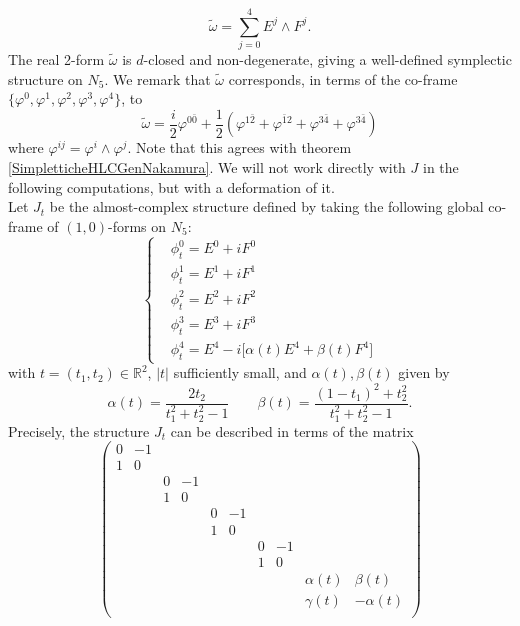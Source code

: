 \documentclass[a4paper, 11pt]{amsart}
\theoremstyle{plain}
\theoremstyle{definition}
\numberwithin{equation}{section}
\begin{document}
\[ \tilde{\omega} = \sum_{j = 0}^{4} E^{j} \wedge F^{j}. \]
The real 2-form $ \tilde{\omega} $ is $ d $-closed and non-degenerate, giving a well-defined symplectic structure on $ N_{5} $. We remark that $  \tilde{\omega}  $ corresponds, in terms of the co-frame $ \{\varphi^{0}, \varphi^{1}, \varphi^{2}, \varphi^{3}, \varphi^{4}\} $, to
\[ \tilde{\omega} = \dfrac{i}{2}\varphi^{0\bar 0} + \dfrac{1}{2}(\varphi^{1\bar 2} + \varphi^{\bar 1 2} + \varphi^{3 \bar 4} + \varphi^{3 \bar 4}) \]
where $ \varphi^{ij} = \varphi^{i} \wedge \varphi^{j} $. Note that this agrees with theorem \ref{SimpletticheHLCGenNakamura}. We will not work directly with $ J $ in the following computations, but with a deformation of it.\\
Let $ J_{t} $ be the almost-complex structure defined by taking the following global co-frame of $ (1,0) $-forms on $ N_{5} $:
\begin{equation*}
\left\{
	\begin{split}
		& \phi_{t}^{0} = E^{0} + iF^{0} \\
		& \phi_{t}^{1} = E^{1} + iF^{1} \\
		& \phi_{t}^{2} = E^{2} + iF^{2} \\
		& \phi_{t}^{3} = E^{3} + iF^{3} \\
		& \phi_{t}^{4} = E^{4} -i\Big[\alpha(t)E^{4} +\beta(t)F^{4}\Big]
	\end{split}
    \right.
\end{equation*}
with $ t = (t_{1}, t_{2}) \in \mathbb{R}^{2} $, $ |t| $ sufficiently small, and $ \alpha(t), \beta(t) $ given by
\[ \alpha(t) = \dfrac{2t_{2}}{t_{1}^{2}+t_{2}^{2} -1} \qquad \beta(t) = \dfrac{(1-t_{1})^{2} + t_{2}^{2}}{t_{1}^{2}+t_{2}^{2} -1}.\]
Precisely, the structure $ J_{t} $ can be described in terms of the matrix
\[ \begin{pmatrix}
	0 & -1 & & & & & & & & \\
	1 & 0 & & & & & & & & \\
	& & 0 & -1 & & & & & & \\
	& & 1 & 0 & & & & & & \\
	& & & &0 & -1 & & & &  \\
	& & & &1 & 0 & & & & \\
	& & & & & & 0 & -1 & & \\
	& & & & & & 1 & 0 & &  \\
	& & & & & & & &  \alpha(t) & \beta(t) \\
	& & & & & & & &  \gamma(t) & -\alpha(t) \\
\end{pmatrix} \]
\end{document}
